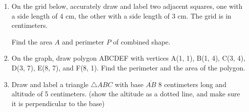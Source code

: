 \begin{enumerate}
\item On the grid below, accurately draw and label two adjacent squares, one with a side length of 4 cm, the other with a side length of 3 cm. The grid is in centimeters. \par \medskip
  Find the area $A$ and perimeter $P$ of combined shape.
  \begin{flushleft}
  \end{flushleft}
  
\item On the graph, draw polygon ABCDEF with vertices A(1, 1), B(1, 4), C(3, 4), D(3, 7), E(8, 7), and F(8, 1). Find the perimeter and the area of the polygon.
\begin{flushleft}
  \end{flushleft}
  
\item Draw and label a triangle $\triangle ABC$ with base $\overline{AB}$ 8 centimeters long and altitude of 5 centimeters. (show the altitude as a dotted line, and make sure it is perpendicular to the base) 
  
  

\end{enumerate}
